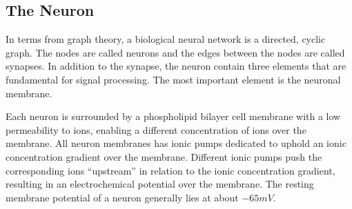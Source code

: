 	\subsection{The Neuron}
		In terms from graph theory, a biological neural network is a directed, cyclic graph.
		The nodes are called neurons and the edges between the nodes are called synapses.
		In addition to the synapse, the neuron contain three elements that are fundamental for signal processing.
		The most important element is the neuronal membrane. %

		



		Each neuron is surrounded by a phospholipid bilayer cell membrane with a low permeability to ions, enabling a different concentration of ions over the membrane.
		All neuron membranes has ionic pumps dedicated to uphold an ionic concentration gradient over the membrane.
		Different ionic pumps push the corresponding ions ``upstream'' in relation to the ionic concentration gradient, resulting in an electrochemical potential over the membrane.
		The resting membrane potential of a neuron generally lies at about $-65mV$. 
		\cite{NeuroscienceExploringTheBrain3edKAP3} %

